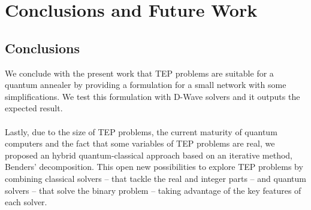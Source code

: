 
\chapter{Conclusions and Future Work} %

\label{Chapter6} %




\section{Conclusions}
We conclude with the present work that TEP problems are suitable for a quantum annealer by providing a formulation for a small network with some simplifications. We test this formulation with D-Wave solvers and it outputs the expected result.\\\\
Lastly, due to the size of TEP problems, the current maturity of quantum computers and the fact that some variables of TEP problems are real, we proposed an hybrid quantum-classical approach based on an iterative method, Benders' decomposition. This open new possibilities to explore TEP problems by combining classical solvers -- that tackle the real and integer parts -- and quantum solvers -- that solve the binary problem -- taking advantage of the key features of each solver.
